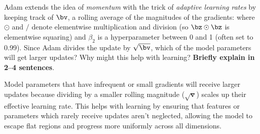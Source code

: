 \begin{parts}
\begin{subparts}
            \subpart[2] Adam extends the idea of {\it momentum} with the trick of {\it adaptive learning rates} by keeping track of  $\bv$, a rolling average of the magnitudes of the gradients:
                where $\odot$ and $/$ denote elementwise multiplication and division (so $\bz \odot \bz$ is elementwise squaring) and $\beta_2$ is a hyperparameter between 0 and 1 (often set to  0.99). Since Adam divides the update by $\sqrt{\bv}$, which of the model parameters will get larger updates?  Why might this help with learning? \textbf{Briefly explain in 2--4 sentences}.
                
           \begin{answer}
                Model parameters that have infrequent or small gradients will receive larger updates because dividing by a smaller rolling magnitude ($\sqrt{\mathbf{v}}$) scales up their effective learning rate. This helps with learning by ensuring that features or parameters which rarely receive updates aren't neglected, allowing the model to escape flat regions and progress more uniformly across all dimensions.
           \end{answer}
                
                \end{subparts}
        
        

\end{parts}
